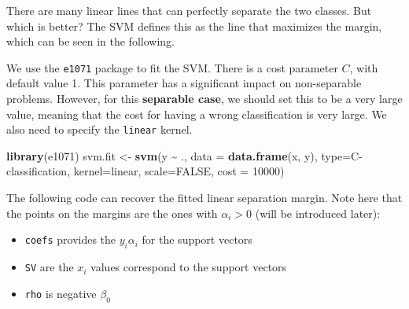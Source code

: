 \documentclass[
]{book}
\newenvironment{Shaded}{\begin{snugshade}}{\end{snugshade}}
\newcommand{\AttributeTok}[1]{\textcolor[rgb]{0.13,0.29,0.53}{#1}}
\newcommand{\ConstantTok}[1]{\textcolor[rgb]{0.56,0.35,0.01}{#1}}
\newcommand{\DecValTok}[1]{\textcolor[rgb]{0.00,0.00,0.81}{#1}}
\newcommand{\FunctionTok}[1]{\textcolor[rgb]{0.13,0.29,0.53}{\textbf{#1}}}
\newcommand{\NormalTok}[1]{#1}
\newcommand{\OtherTok}[1]{\textcolor[rgb]{0.56,0.35,0.01}{#1}}
\newcommand{\SpecialCharTok}[1]{\textcolor[rgb]{0.81,0.36,0.00}{\textbf{#1}}}
\newcommand{\StringTok}[1]{\textcolor[rgb]{0.31,0.60,0.02}{#1}}
\providecommand{\tightlist}{%
  \setlength{\itemsep}{0pt}\setlength{\parskip}{0pt}}
\theoremstyle{definition}
\theoremstyle{definition}
\theoremstyle{definition}
\theoremstyle{definition}
\theoremstyle{remark}
\begin{document}
There are many linear lines that can perfectly separate the two classes. But which is better? The SVM defines this as the line that maximizes the margin, which can be seen in the following.

We use the \texttt{e1071} package to fit the SVM. There is a cost parameter \(C\), with default value 1. This parameter has a significant impact on non-separable problems. However, for this \textbf{separable case}, we should set this to be a very large value, meaning that the cost for having a wrong classification is very large. We also need to specify the \texttt{linear} kernel.

\begin{Shaded}
\begin{Highlighting}[]
    \FunctionTok{library}\NormalTok{(e1071)}
\NormalTok{    svm.fit }\OtherTok{\textless{}{-}} \FunctionTok{svm}\NormalTok{(y }\SpecialCharTok{\textasciitilde{}}\NormalTok{ ., }\AttributeTok{data =} \FunctionTok{data.frame}\NormalTok{(x, y), }\AttributeTok{type=}\StringTok{\textquotesingle{}C{-}classification\textquotesingle{}}\NormalTok{, }
                   \AttributeTok{kernel=}\StringTok{\textquotesingle{}linear\textquotesingle{}}\NormalTok{, }\AttributeTok{scale=}\ConstantTok{FALSE}\NormalTok{, }\AttributeTok{cost =} \DecValTok{10000}\NormalTok{)}
\end{Highlighting}
\end{Shaded}

The following code can recover the fitted linear separation margin. Note here that the points on the margins are the ones with \(\alpha_i > 0\) (will be introduced later):

\begin{itemize}
\tightlist
\item
  \texttt{coefs} provides the \(y_i \alpha_i\) for the support vectors
\item
  \texttt{SV} are the \(x_i\) values correspond to the support vectors
\item
  \texttt{rho} is negative \(\beta_0\)
\end{itemize}
\end{document}
